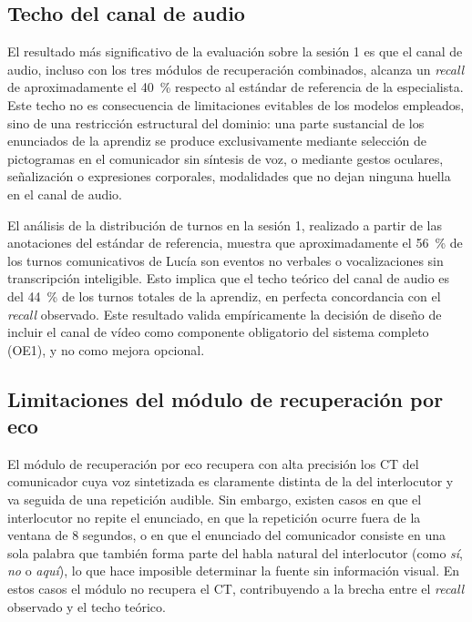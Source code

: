 \subsection{Techo del canal de audio}
\label{subsec:lim_audio}

El resultado más significativo de la evaluación sobre la sesión 1 es que el canal de
audio, incluso con los tres módulos de recuperación combinados, alcanza un \emph{recall}
de aproximadamente el 40~\% respecto al estándar de referencia de la especialista. Este
techo no es consecuencia de limitaciones evitables de los modelos empleados, sino de
una restricción estructural del dominio: una parte sustancial de los enunciados de la
aprendiz se produce exclusivamente mediante selección de pictogramas en el comunicador
sin síntesis de voz, o mediante gestos oculares, señalización o expresiones corporales,
modalidades que no dejan ninguna huella en el canal de audio.

El análisis de la distribución de turnos en la sesión 1, realizado a partir de las
anotaciones del estándar de referencia, muestra que aproximadamente el 56~\% de los
turnos comunicativos de Lucía son eventos no verbales o vocalizaciones sin transcripción
inteligible. Esto implica que el techo teórico del canal de audio es del 44~\% de los
turnos totales de la aprendiz, en perfecta concordancia con el \emph{recall} observado.
Este resultado valida empíricamente la decisión de diseño de incluir el canal de vídeo
como componente obligatorio del sistema completo (OE1), y no como mejora opcional.

\subsection{Limitaciones del módulo de recuperación por eco}
\label{subsec:lim_eco}

El módulo de recuperación por eco recupera con alta precisión los \ac{CT} del
comunicador cuya voz sintetizada es claramente distinta de la del interlocutor y va
seguida de una repetición audible. Sin embargo, existen casos en que el interlocutor
no repite el enunciado, en que la repetición ocurre fuera de la ventana de 8 segundos,
o en que el enunciado del comunicador consiste en una sola palabra que también forma
parte del habla natural del interlocutor (como \emph{sí}, \emph{no} o \emph{aquí}),
lo que hace imposible determinar la fuente sin información visual. En estos casos el
módulo no recupera el \ac{CT}, contribuyendo a la brecha entre el \emph{recall}
observado y el techo teórico.

